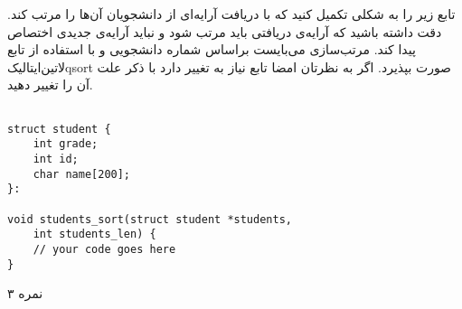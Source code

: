 \documentclass[../main.tex]{subfiles}
\begin{document}

تابع زیر را به شکلی تکمیل کنید که با دریافت آرایه‌ای از دانشجویان آن‌ها را مرتب کند.
دقت داشته باشید که آرایه‌ی دریافتی باید مرتب شود و نباید آرایه‌ی جدیدی اختصاص پیدا کند.
مرتب‌سازی می‌بایست براساس شماره دانشجویی و با استفاده از تابع
‌لاتین{‌ایتالیک{qsort}}
صورت بپذیرد.
اگر به نظرتان امضا تابع نیاز به تغییر دارد با ذکر علت آن را تغییر دهید.

\begin{latin}
\begin{verbatim}

struct student {
    int grade;
    int id;
    char name[200];
}:

void students_sort(struct student *students,
    int students_len) {
    // your code goes here
}
\end{verbatim}
\end{latin}

۳ نمره
\end{document}
